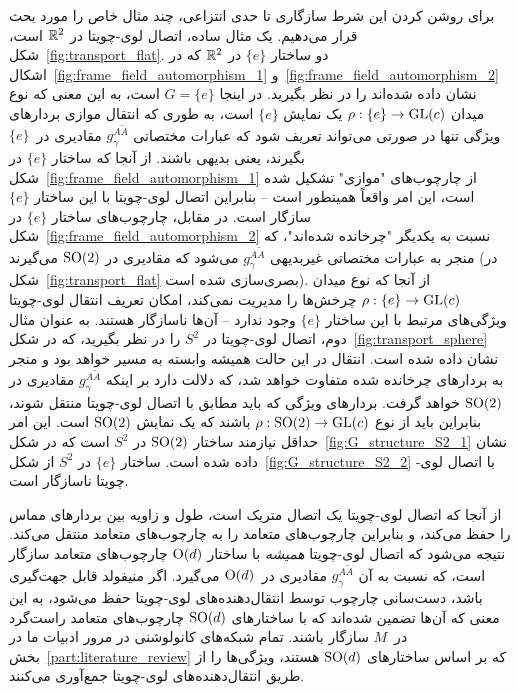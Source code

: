 برای روشن کردن این شرط سازگاری تا حدی انتزاعی، چند مثال خاص را مورد بحث قرار می‌دهیم.
یک مثال ساده، اتصال لوی-چویتا در $\mathbb{R}^2$ است، شکل~\ref{fig:transport_flat}.
دو ساختار $\{e\}$ در $\mathbb{R}^2$ که در اشکال~\ref{fig:frame_field_automorphism_1} و~\ref{fig:frame_field_automorphism_2} نشان داده شده‌اند را در نظر بگیرید.
در اینجا $G=\{e\}$ است، به این معنی که نوع میدان $\rho: \{e\} \to \operatorname{GL}(c)$ یک نمایش $\{e\}$ است، به طوری که انتقال موازی بردارهای ویژگی تنها در صورتی می‌تواند تعریف شود که عبارات مختصاتی $g_\gamma^{A\widetilde{A}}$ مقادیری در~$\{e\}$ بگیرند، یعنی بدیهی باشند.
از آنجا که ساختار $\{e\}$ در شکل~\ref{fig:frame_field_automorphism_1} از چارچوب‌های "موازی" تشکیل شده است، این امر واقعاً همینطور است -- بنابراین اتصال لوی-چویتا با این ساختار $\{e\}$ سازگار است.
در مقابل، چارچوب‌های ساختار $\{e\}$ در شکل~\ref{fig:frame_field_automorphism_2} نسبت به یکدیگر "چرخانده شده‌اند"، که منجر به عبارات مختصاتی غیربدیهی $g_\gamma^{A\widetilde{A}}$ می‌شود که مقادیری در $\operatorname{SO}(2)$ می‌گیرند (در شکل~\ref{fig:transport_flat} بصری‌سازی شده است).
از آنجا که نوع میدان $\rho: \{e\} \to \operatorname{GL}(c)$ چرخش‌ها را مدیریت نمی‌کند، امکان تعریف انتقال لوی-چویتا ویژگی‌های مرتبط با این ساختار $\{e\}$ وجود ندارد -- آن‌ها ناسازگار هستند.
به عنوان مثال دوم، اتصال لوی-چویتا در $S^2$ را در نظر بگیرید، که در شکل~\ref{fig:transport_sphere} نشان داده شده است.
انتقال در این حالت همیشه وابسته به مسیر خواهد بود و منجر به بردارهای چرخانده شده متفاوت خواهد شد، که دلالت دارد بر اینکه $g_\gamma^{A\widetilde{A}}$ مقادیری در $\operatorname{SO}(2)$ خواهد گرفت.
بردارهای ویژگی که باید مطابق با اتصال لوی-چویتا منتقل شوند، بنابراین باید از نوع $\rho: \operatorname{SO}(2) \to \operatorname{GL}(c)$ باشند که یک نمایش $\operatorname{SO}(2)$ است.
این امر حداقل نیازمند ساختار $\operatorname{SO}(2)$ در $S^2$ است که در شکل~\ref{fig:G_structure_S2_1} نشان داده شده است.
ساختار $\{e\}$ در $S^2$ از شکل~\ref{fig:G_structure_S2_2} با اتصال لوی-چویتا ناسازگار است.


از آنجا که اتصال لوی-چویتا یک اتصال متریک است، طول و زاویه بین بردارهای مماس را حفظ می‌کند، و بنابراین چارچوب‌های متعامد را به چارچوب‌های متعامد منتقل می‌کند.
نتیجه می‌شود که اتصال لوی-چویتا \emph{همیشه} با ساختار $\operatorname{O}(d)$ چارچوب‌های متعامد سازگار است، که نسبت به آن $g_\gamma^{A\widetilde{A}}$ مقادیری در~$\operatorname{O}(d)$ می‌گیرد.
اگر منیفولد قابل جهت‌گیری باشد، دست‌سانی چارچوب توسط انتقال‌دهنده‌های لوی-چویتا حفظ می‌شود، به این معنی که آن‌ها تضمین شده‌اند که با ساختارهای $\operatorname{SO}(d)$ چارچوب‌های متعامد راست‌گرد در~$M$ سازگار باشند.
تمام شبکه‌های کانولوشنی در مرور ادبیات ما در بخش~\ref{part:literature_review} که بر اساس ساختارهای $\operatorname{SO}(d)$ هستند، ویژگی‌ها را از طریق انتقال‌دهنده‌های لوی-چویتا جمع‌آوری می‌کنند.


